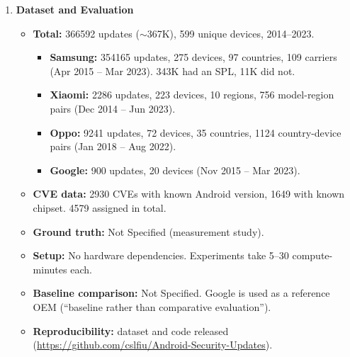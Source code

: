 \documentclass[11pt,a4paper]{article}
\newcommand{\entrypart}[1]{\textbf{\color{accent}#1}\par\vspace{2pt}}
\begin{document}
\begin{enumerate}
\begin{itemize}
\begin{itemize}
            \item CVEs published before EOL filtered out. Remaining CVEs grouped into 3-month quarters after EOL.
            \item Aggregated with a cumulative weighted average (CWA) over active devices per quarter.
        \end{itemize}
        \item \textbf{Factor analysis:} support type, geolocation, device type, carrier association, partnership/platform programs (AER, Samsung Knox).
        \item \textbf{Tools:} Jupyter notebooks, Python (pandas, numpy, matplotlib, plotly, etc.).
    \end{itemize}

    \item \entrypart{Dataset and Evaluation}

    \begin{itemize}
        \item \textbf{Total:} 366592 updates ($\sim$367K), 599 unique devices, 2014--2023.
        \begin{itemize}
            \item \textbf{Samsung:} 354165 updates, 275 devices, 97 countries, 109 carriers (Apr 2015 -- Mar 2023). 343K had an SPL, 11K did not.
            \item \textbf{Xiaomi:} 2286 updates, 223 devices, 10 regions, 756 model-region pairs (Dec 2014 -- Jun 2023).
            \item \textbf{Oppo:} 9241 updates, 72 devices, 35 countries, 1124 country-device pairs (Jan 2018 -- Aug 2022).
            \item \textbf{Google:} 900 updates, 20 devices (Nov 2015 -- Mar 2023).
        \end{itemize}
        \item \textbf{CVE data:} 2930 CVEs with known Android version, 1649 with known chipset. 4579 assigned in total.
        \item \textbf{Ground truth:} Not Specified (measurement study).
        \item \textbf{Setup:} No hardware dependencies. Experiments take 5--30 compute-minutes each.
        \item \textbf{Baseline comparison:} Not Specified. Google is used as a reference OEM (``baseline rather than comparative evaluation'').
        \item \textbf{Reproducibility:} dataset and code released (\url{https://github.com/cslfiu/Android-Security-Updates}).
    \end{itemize}


\end{enumerate}
\end{document}
